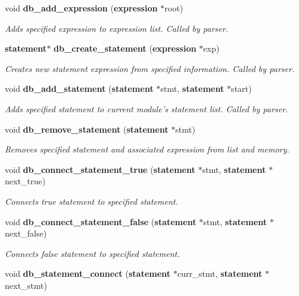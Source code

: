 \begin{CompactItemize}
void {\bf db\_\-add\_\-expression} ({\bf expression} $\ast$root)
\begin{CompactList}\small\item\em Adds specified expression to expression list. Called by parser.\item\end{CompactList}\item 
{\bf statement}$\ast$ {\bf db\_\-create\_\-statement} ({\bf expression} $\ast$exp)
\begin{CompactList}\small\item\em Creates new statement expression from specified information. Called by parser.\item\end{CompactList}\item 
void {\bf db\_\-add\_\-statement} ({\bf statement} $\ast$stmt, {\bf statement} $\ast$start)
\begin{CompactList}\small\item\em Adds specified statement to current module's statement list. Called by parser.\item\end{CompactList}\item 
void {\bf db\_\-remove\_\-statement} ({\bf statement} $\ast$stmt)
\begin{CompactList}\small\item\em Removes specified statement and associated expression from list and memory.\item\end{CompactList}\item 
void {\bf db\_\-connect\_\-statement\_\-true} ({\bf statement} $\ast$stmt, {\bf statement} $\ast$next\_\-true)
\begin{CompactList}\small\item\em Connects true statement to specified statement.\item\end{CompactList}\item 
void {\bf db\_\-connect\_\-statement\_\-false} ({\bf statement} $\ast$stmt, {\bf statement} $\ast$next\_\-false)
\begin{CompactList}\small\item\em Connects false statement to specified statement.\item\end{CompactList}\item 
void {\bf db\_\-statement\_\-connect} ({\bf statement} $\ast$curr\_\-stmt, {\bf statement} $\ast$next\_\-stmt)

\end{CompactItemize}
